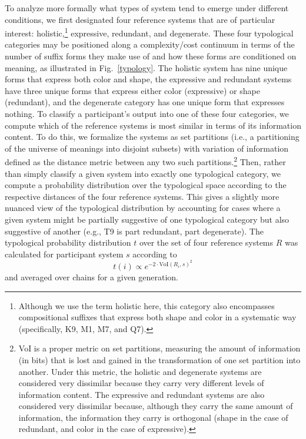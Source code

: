 \documentclass[doc,biblatex]{apa7}
\begin{document}
To analyze more formally what types of system tend to emerge under different conditions, we first designated four reference systems that are of particular interest: holistic,\footnote{Although we use the term holistic here, this category also encompasses compositional suffixes that express both shape and color in a systematic way (specifically, K9, M1, M7, and Q7).} expressive, redundant, and degenerate. These four typological categories may be positioned along a complexity/cost continuum in terms of the number of suffix forms they make use of and how these forms are conditioned on meaning, as illustrated in Fig.~\ref{typology}. The holistic system has nine unique forms that express both color and shape, the expressive and redundant systems have three unique forms that express either color (expressive) or shape (redundant), and the degenerate category has one unique form that expresses nothing. To classify a participant's output into one of these four categories, we compute which of the reference systems is most similar in terms of its information content. To do this, we formalize the systems as set partitions (i.e., a partitioning of the universe of meanings into disjoint subsets) with variation of information \parencite[VoI;][]{Meila:2007} defined as the distance metric between any two such partitions.\footnote{VoI is a proper metric on set partitions, measuring the amount of information (in bits) that is lost and gained in the transformation of one set partition into another. Under this metric, the holistic and degenerate systems are considered very dissimilar because they carry very different levels of information content. The expressive and redundant systems are also considered very dissimilar because, although they carry the same amount of information, the information they carry is orthogonal (shape in the case of redundant, and color in the case of expressive).} Then, rather than simply classify a given system into exactly one typological category, we compute a probability distribution over the typological space according to the respective distances of the four reference systems. This gives a slightly more nuanced view of the typological distribution by accounting for cases where a given system might be partially suggestive of one typological category but also suggestive of another (e.g., T9 is part redundant, part degenerate). The typological probability distribution $t$ over the set of four reference systems $R$ was calculated for participant system $s$ according to%
\begin{equation}
	t(i) \propto e^{-2 \cdot \mathrm{VoI}(R_i, s)^2}
\end{equation}
and averaged over chains for a given generation.
\end{document}
